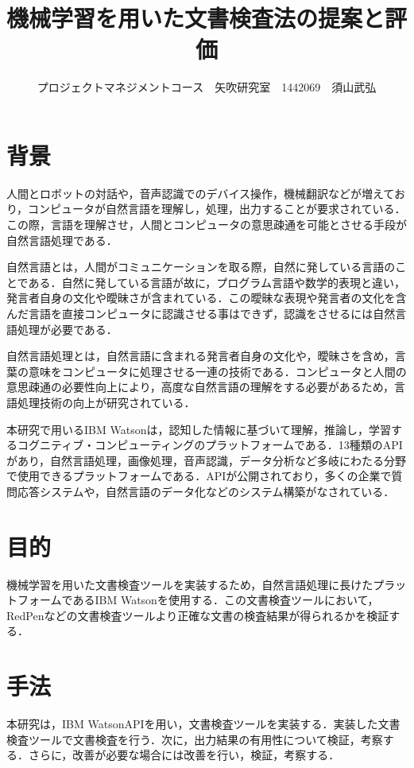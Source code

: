 \documentclass[uplatex,twocolumn,dvipdfmx]{jsarticle}
\title{\vspace{-5mm}\fontsize{14pt}{0pt}\selectfont 機械学習を用いた文書検査法の提案と評価}
\author{\normalsize プロジェクトマネジメントコース　矢吹研究室　1442069　須山武弘}
\date{}
\begin{document}
\fontsize{10.5pt}{\baselineskip}\selectfont
\maketitle





\section{背景}
人間とロボットの対話や，音声認識でのデバイス操作，機械翻訳などが増えており，コンピュータが自然言語を理解し，処理，出力することが要求されている．この際，言語を理解させ，人間とコンピュータの意思疎通を可能とさせる手段が自然言語処理である．

自然言語とは，人間がコミュニケーションを取る際，自然に発している言語のことである．自然に発している言語が故に，プログラム言語や数学的表現と違い，発言者自身の文化や曖昧さが含まれている．この曖昧な表現や発言者の文化を含んだ言語を直接コンピュータに認識させる事はできず，認識をさせるには自然言語処理が必要である．

自然言語処理とは，自然言語に含まれる発言者自身の文化や，曖昧さを含め，言葉の意味をコンピュータに処理させる一連の技術である．コンピュータと人間の意思疎通の必要性向上により，高度な自然言語の理解をする必要があるため，言語処理技術の向上が研究されている\cite{001}．

本研究で用いるIBM Watsonは，認知した情報に基づいて理解，推論し，学習するコグニティブ・コンピューティングのプラットフォームである\cite{003}．13種類のAPIがあり，自然言語処理，画像処理，音声認識，データ分析など多岐にわたる分野で使用できるプラットフォームである．APIが公開されており，多くの企業で質問応答システムや，自然言語のデータ化などのシステム構築がなされている\cite{002}．

\section{目的}
機械学習を用いた文書検査ツールを実装するため，自然言語処理に長けたプラットフォームであるIBM Watsonを使用する．この文書検査ツールにおいて，RedPenなどの文書検査ツールより正確な文書の検査結果が得られるかを検証する．

\section{手法}
本研究は，IBM WatsonAPIを用い，文書検査ツールを実装する．実装した文書検査ツールで文書検査を行う．次に，出力結果の有用性について検証，考察する．さらに，改善が必要な場合には改善を行い，検証，考察する．
\end{document}
